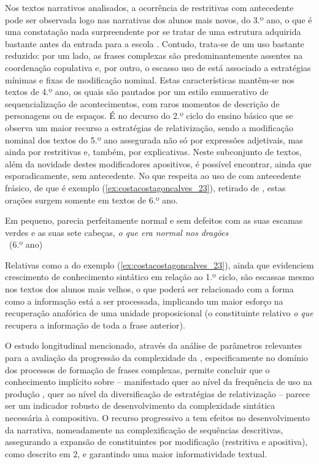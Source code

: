 \documentclass[output=paper]{LSP/langsci}
\begin{document}
Nos textos narrativos analisados, a ocorrência de  restritivas com antecedente pode ser observada logo nas narrativas dos alunos mais novos, do 3.º ano, o que é uma constatação nada surpreendente por se tratar de uma estrutura adquirida bastante antes da entrada para a escola \citep{vasconcelos1996}. Contudo, trata-se de um uso bastante reduzido: por um lado, as frases complexas são predominantemente assentes na coordenação copulativa e, por outro, o escasso uso de  está associado a estratégias mínimas e fixas de modificação nominal. Estas características mantêm-se nos textos de 4.º ano, os quais são pautados por um estilo enumerativo de sequencialização de acontecimentos, com raros momentos de descrição de personagens ou de espaços. É no decurso do 2.º ciclo do ensino básico que se observa um maior recurso a estratégias de relativização, sendo a modificação nominal dos textos do 5.º ano assegurada não só por expressões adjetivais, mas ainda por  restritivas e, também, por explicativas. Neste subconjunto de textos, além da novidade destes modificadores apositivos, é possível encontrar, ainda que esporadicamente,  sem antecedente. No que respeita ao uso de  com antecedente frásico, de que é exemplo (\ref{ex:costacostagoncalves_23}), retirado de \citet[310]{costagoncalves2010}, estas orações surgem somente em textos de 6.º ano.\newpage

\ea\label{ex:costacostagoncalves_23} 	Em pequeno, parecia perfeitamente normal e sem defeitos com as suas escamas verdes e as suas sete cabeças, \textit{o que era normal nos dragões}\\~\hfill(6.º ano)\z

Relativas como a do exemplo (\ref{ex:costacostagoncalves_23}), ainda que evidenciem crescimento de conhecimento sintático em relação ao 1.º ciclo, são escassas mesmo nos textos dos alunos mais velhos, o que poderá ser relacionado com a forma como a informação está a ser processada, implicando um maior esforço na recuperação anafórica de uma unidade proposicional (o constituinte relativo \textit{o que} recupera a informação de toda a frase anterior).

O estudo longitudinal mencionado, através da análise de parâmetros relevantes para a avaliação da progressão da complexidade da , especificamente no domínio dos processos de formação de frases complexas, permite concluir que o conhecimento implícito sobre  – manifestado quer ao nível da frequência de uso na produção , quer ao nível da diversificação de estratégias de relativização – parece ser um indicador robusto de desenvolvimento da complexidade sintática necessária à  compositiva. O recurso progressivo a  tem efeitos no desenvolvimento da  narrativa, nomeadamente na complexificação de sequências descritivas, assegurando a expansão de constituintes por modificação (restritiva e apositiva), como descrito em 2, e garantindo uma maior informatividade textual.
\end{document}

